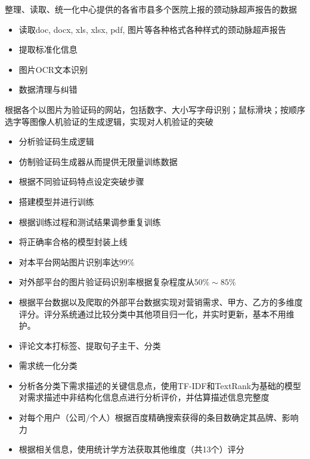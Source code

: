 \documentclass[9pt,a4paper]{altacv}
\begin{document}
\begin{fullwidth}
\begin{multicols}{2}
		\divider
		
		整理、读取、统一化中心提供的各省市县多个医院上报的颈动脉超声报告的数据
		\begin{itemize}
			\item 读取doc, docx, xls, xlsx, pdf, 图片等各种格式各种样式的颈动脉超声报告
			\item 提取标准化信息
			\item 图片OCR文本识别
			\item 数据清理与纠错

		\end{itemize}
		
		\divider
		
		根据各个以图片为验证码的网站，包括数字、大小写字母识别；鼠标滑块；按顺序选字等图像人机验证的生成逻辑，实现对人机验证的突破
		\begin{itemize}
			\item 分析验证码生成逻辑
			\item 仿制验证码生成器从而提供无限量训练数据
			\item 根据不同验证码特点设定突破步骤
			\item 搭建模型并进行训练
			\item 根据训练过程和测试结果调参重复训练
			\item 将正确率合格的模型封装上线
			\item 对本平台网站图片识别率达$99\%$
			\item 对外部平台的图片验证码识别率根据复杂程度从$50\% \sim 85\%$
		\end{itemize}
		
		\divider
		
		\begin{itemize}
			\item 根据平台数据以及爬取的外部平台数据实现对营销需求、甲方、乙方的多维度评分。评分系统通过比较分类中其他项目归一化，并实时更新，基本不用维护。
			\item 评论文本打标签、提取句子主干、分类
			\item 需求统一化分类
			\item 分析各分类下需求描述的关键信息点，使用TF-IDF和TextRank为基础的模型对需求描述中非结构化信息点进行分析评价，并估算描述信息完整度
			\item 对每个用户（公司/个人）根据百度精确搜索获得的条目数确定其品牌、影响力
			\item 根据相关信息，使用统计学方法获取其他维度（共13个）评分
		\end{itemize}
		

\end{multicols}
\end{fullwidth}
\end{document}
